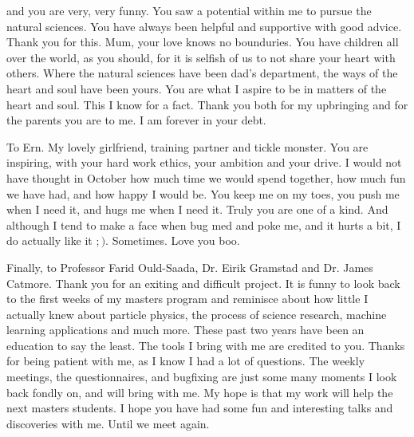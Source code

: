 and you are very, very funny. You saw a potential within me to pursue the natural sciences. You have always been helpful and supportive 
with good advice. Thank you for this. Mum, your love knows no bounduries. You have children all over the world, as you should, 
for it is selfish of us to not share your heart with others. Where the natural sciences have been dad's department, the ways 
of the heart and soul have been yours. You are what I aspire to be in matters of the heart and soul. This I know for a fact. 
Thank you both for my upbringing and for the parents you are to me. I am forever in your debt. \par 
To Ern. My lovely girlfriend, training partner and tickle monster. You are inspiring, with your hard work ethics, your ambition 
and your drive. I would not have thought in October how much time we would spend together, how much fun we have had, and how happy 
I would be. You keep me on my toes, you push me when I need it, and hugs me when I need it. Truly you are one of a kind. 
And although I tend to make a face when bug med and poke me, and it hurts a bit, I do actually like it $;)$. Sometimes. Love you boo.\par
Finally, to Professor Farid Ould-Saada, Dr. Eirik Gramstad and Dr. James Catmore. Thank you for an exiting and difficult project. 
It is funny to look back to the first weeks of my masters program and reminisce about how little I actually knew about particle physics, 
the process of science research, machine learning applications and much more. These past two years have been an education 
to say the least. The tools I bring with me are credited to you. Thanks for being patient with me, as I know I had a lot of questions. 
The weekly meetings, the questionnaires, and bugfixing are just some many moments I look back fondly on, and will bring with me. 
My hope is that my work will help the next masters students. I hope you have had some fun and interesting talks 
and discoveries with me. Until we meet again. 
